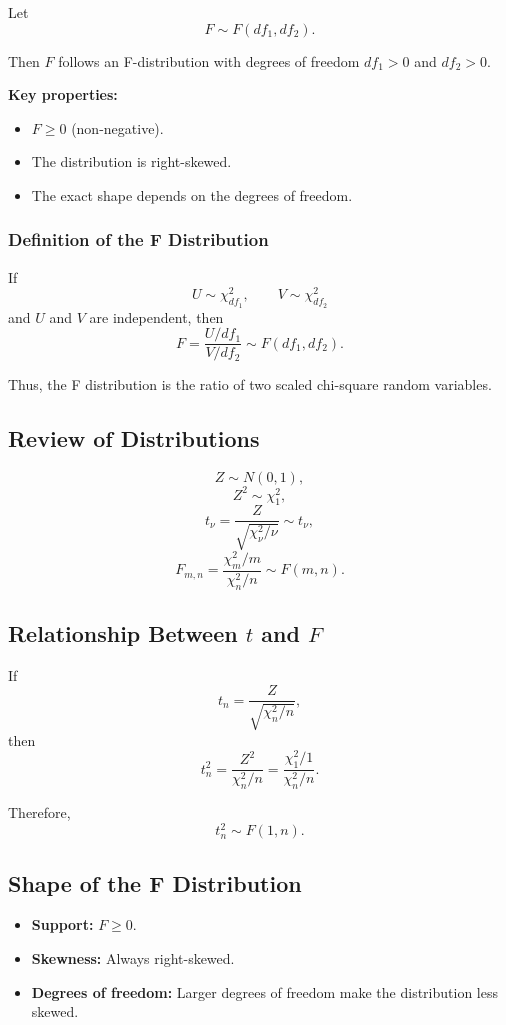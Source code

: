 Let
\[
F \sim F(df_1, df_2).
\]

Then $F$ follows an F-distribution with degrees of freedom $df_1>0$ and $df_2>0$.

\textbf{Key properties:}
\begin{itemize}
\item $F \ge 0$ (non-negative).
\item The distribution is right-skewed.
\item The exact shape depends on the degrees of freedom.
\end{itemize}

\subsubsection{Definition of the F Distribution}

If
\[
U \sim \chi^2_{df_1}, \qquad V \sim \chi^2_{df_2}
\]
and $U$ and $V$ are independent, then
\[
F = \frac{U/df_1}{V/df_2}
\sim F(df_1, df_2).
\]

Thus, the F distribution is the ratio of two scaled chi-square random variables.

\subsection{Review of Distributions}

\[
Z \sim N(0,1),
\]
\[
Z^2 \sim \chi^2_1,
\]
\[
t_\nu = \frac{Z}{\sqrt{\chi^2_\nu/\nu}}
\sim t_\nu,
\]
\[
F_{m,n} =
\frac{\chi^2_m/m}{\chi^2_n/n}
\sim F(m,n).
\]

\subsection{Relationship Between $t$ and $F$}

If
\[
t_n = \frac{Z}{\sqrt{\chi^2_n/n}},
\]
then
\[
t_n^2
=
\frac{Z^2}{\chi^2_n/n}
=
\frac{\chi^2_1/1}{\chi^2_n/n}.
\]

Therefore,
\[
t_n^2 \sim F(1,n).
\]

\subsection{Shape of the F Distribution}

\begin{itemize}
\item \textbf{Support:} $F \ge 0$.
\item \textbf{Skewness:} Always right-skewed.
\item \textbf{Degrees of freedom:} Larger degrees of freedom make the distribution less skewed.
\end{itemize}

